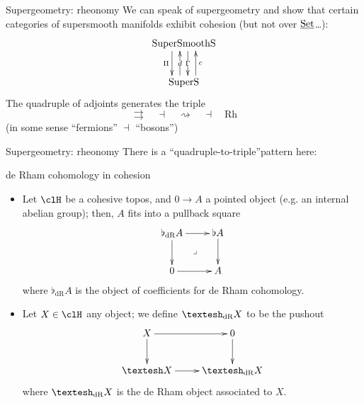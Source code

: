 \documentclass[presentation,handout]{beamer}
\begin{document}
\begin{frame}{Supergeometry: rheonomy}
  We can speak of \alert{supergeometry} and show that certain categories of supersmooth manifolds exhibit cohesion (but not over $\underline{\text{Set}}$\dots):
  \[
  \xymatrix{
  \text{SuperSmoothS}
  \ar@<12pt>@{<-}[d]^c
  \ar@<-4pt>@{<-}[d]|d
  \ar@<4pt>[d]|\Gamma
  \ar@<-12pt>[d]_\Pi\\
  \text{SuperS}
  }
  \]
  The quadruple of adjoints generates the triple
  \[\rightrightarrows
  \quad \dashv \quad
  \rightsquigarrow
  \quad \dashv \quad
  \textrm{Rh}\]
  (in some sense ``fermions'' $\dashv$ ``bosons'')
\end{frame}
%
%
%
%
%
%
%
\begin{frame}{Supergeometry: rheonomy}
  There is a ``quadruple-to-triple''pattern here:
  \def\fisrt{\text{cohesion}}
  \def\secnod{\text{elasticity}}
  \def\trhid{\text{solidity}}
  \begin{center}
  \end{center}
\end{frame}
%
%
%
%
%
%
%
\begin{frame}{de Rham cohomology in cohesion}
  \begin{itemize}
    \item Let $\clH$ be a cohesive topos, and $0\to A$ a pointed object (e.g. an internal abelian group); then, $A$ fits into a pullback square 
    \[\xymatrix{\flat_\text{dR}A\ar[r]\ar[d]\ar@{}[dr]|\lrcorner & \flat A \ar[d]\\ 
    0 \ar[r] & A }\]
    where $\flat_\text{dR}A$ is the \alert{object of coefficients} for de Rham cohomology.
    \item Let $X\in\clH$ any object; we define $\shape_\text{dR}X$ to be the pushout
    \[\xymatrix{
    X \ar[r]\ar[d]& 0\ar[d] \\
    \shape X \ar[r] & \shape_\text{dR}X
    }\]
    where $\shape_\text{dR}X$ is the \alert{de Rham object} associated to $X$.
  \end{itemize}
\end{frame}
\end{document}
